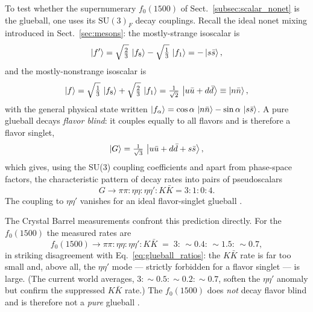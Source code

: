 To test whether the supernumerary $f_0(1500)$ of
Sect.~\ref{subsec:scalar_nonet} is the glueball, one uses its
$\mathrm{SU(3)}_{F}$ decay couplings. Recall the ideal nonet mixing introduced in
Sect.~\ref{sec:mesons}: the mostly-strange isoscalar is
\begin{equation}
  \ket{f'} = \sqrt{\tfrac{2}{3}}\,\ket{f_8} - \sqrt{\tfrac{1}{3}}\,\ket{f_1}
           = -\ket{s\bar s},
  \label{eq:fprime_ideal}
\end{equation}
and the mostly-nonstrange isoscalar is
\begin{equation}
  \ket{f} = \sqrt{\tfrac{1}{3}}\,\ket{f_8} + \sqrt{\tfrac{2}{3}}\,\ket{f_1}
          = \tfrac{1}{\sqrt{2}}\,\ket{u\bar u + d\bar d} \equiv \ket{n\bar n},
  \label{eq:f_ideal}
\end{equation}
with the general physical state written $\ket{f_\alpha}=\cos\alpha\,\ket{n\bar n}
-\sin\alpha\,\ket{s\bar s}$. A pure glueball decays \emph{flavor blind}: it
couples equally to all flavors and is therefore a flavor singlet,
\begin{equation}
  \ket{G} = \tfrac{1}{\sqrt{3}}\,\ket{u\bar u + d\bar d + s\bar s},
  \label{eq:glueball_singlet}
\end{equation}
which gives, using the SU(3) coupling coefficients and apart from phase-space
factors, the characteristic pattern of decay rates into pairs of pseudoscalars
\begin{equation}
  G \to \pi\pi : \eta\eta : \eta\eta' : K\bar K = 3 : 1 : 0 : 4 .
  \label{eq:glueball_ratios}
\end{equation}
The coupling to $\eta\eta'$ vanishes for an ideal flavor-singlet glueball
\cite[Ch.~11]{Amsler2018}.

The Crystal Barrel measurements confront this prediction directly. For the
$f_0(1500)$ the measured rates are
\begin{equation}
  f_0(1500) \to \pi\pi : \eta\eta : \eta\eta' : K\bar K
  \;=\; 3 : \,\sim\!0.4 : \,\sim\!1.5 : \,\sim\!0.7 ,
  \label{eq:f1500_ratios}
\end{equation}
in striking disagreement with Eq.~\eqref{eq:glueball_ratios}: the $K\bar K$ rate
is far too small and, above all, the $\eta\eta'$ mode --- strictly forbidden for a
flavor singlet --- is large. (The current world averages,
$3:\sim\!0.5:\sim\!0.2:\sim\!0.7$, soften the $\eta\eta'$ anomaly but confirm the
suppressed $K\bar K$ rate.) The $f_0(1500)$ does \emph{not} decay flavor blind
and is therefore not a \emph{pure} glueball \cite[Ch.~11]{Amsler2018}.

